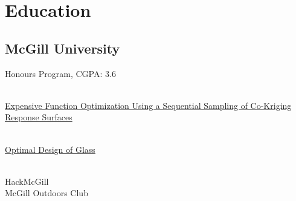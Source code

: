 \documentclass[letterpaper]{deedy-resume} %
\begin{document}



\begin{minipage}[t]{0.33\textwidth} %


\section{Education}

\subsection{McGill University}
Honours Program, CGPA: 3.6

\insectionspace
{} \\
\href{https://dl.dropboxusercontent.com/u/14503566/thesis.pdf}{Expensive Function Optimization Using a Sequential Sampling
of Co-Kriging Response Surfaces}

\insectionspace
{} \\
\href{https://dl.dropboxusercontent.com/u/14503566/thesis.pdf}{Optimal
Design of Glass}

\insectionspace
{} \\
HackMcGill \\
McGill Outdoors Club
\sectionspace %



\end{minipage}
\end{document}
